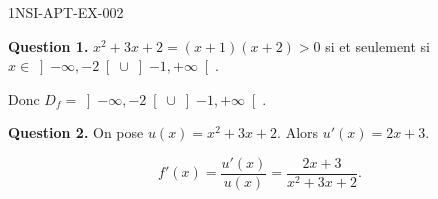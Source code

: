 \begin{corrige}{1NSI-APT-EX-002}

\textbf{Question 1.} $x^2+3x+2 = (x+1)(x+2) > 0$ si et seulement si $x \in \left]-\infty, -2\right[ \cup \left]-1, +\infty\right[$.

Donc $D_f = \left]-\infty, -2\right[ \cup \left]-1, +\infty\right[$.


\textbf{Question 2.} On pose $u(x) = x^2+3x+2$. Alors $u'(x) = 2x+3$.

\[ f'(x) = \frac{u'(x)}{u(x)} = \frac{2x+3}{x^2+3x+2}. \]

\end{corrige}
